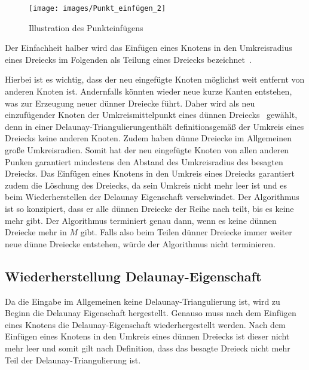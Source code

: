  \begin{figure}[h]
    \centering
    \texttt{[image: images/Punkt\_einfügen\_2]}
    \caption{Illustration des Punkteinfügens\cite{Sharp:2019:NIT} }%
    \label{fig:Punkt_einfügen}
\end{figure}
 
 
Der Einfachheit halber wird das Einfügen eines Knotens in den Umkreisradius eines Dreiecks im Folgenden als Teilung eines Dreiecks  bezeichnet~\cite[zitiert nach \cite{shewchuk:1997:delaunay}]{Frey:1987:Umkreismittelpunkt}.
 

Hierbei ist es wichtig, dass der neu eingefügte Knoten möglichst weit entfernt von anderen Knoten ist. Andernfalls könnten wieder neue kurze Kanten entstehen, was zur Erzeugung neuer dünner Dreiecke führt. 
Daher wird als neu einzufügender Knoten der Umkreismittelpunkt eines dünnen Dreiecks~\cite{ruppert:1995:delaunay, Frey:1987:Umkreismittelpunkt} gewählt, denn in einer Delaunay-Triangulierungenthält definitionsgemäß der Umkreis eines Dreiecks keine anderen Knoten. Zudem haben dünne Dreiecke im Allgemeinen große Umkreisradien. Somit hat der neu eingefügte Knoten von allen anderen Punken garantiert mindestens den Abstand des Umkreisradius des besagten Dreiecks. Das Einfügen eines Knotens in den Umkreis eines Dreiecks garantiert zudem die Löschung des Dreiecks, da sein Umkreis nicht mehr leer ist und es beim Wiederherstellen der Delaunay Eigenschaft verschwindet. 
Der Algorithmus ist so konzipiert, dass er alle dünnen Dreiecke der Reihe nach teilt, bis es keine mehr gibt. Der Algorithmus terminiert genau dann, wenn es keine dünnen Dreiecke mehr in $M$ gibt. Falls also beim Teilen dünner Dreiecke immer weiter neue dünne Dreiecke entstehen, würde der Algorithmus nicht terminieren.


 

\subsection*{Wiederherstellung Delaunay-Eigenschaft}
Da die Eingabe im Allgemeinen keine Delaunay-Triangulierung ist, wird zu Beginn die Delaunay Eigenschaft hergestellt.
Genauso muss nach dem Einfügen eines Knotens die Delaunay-Eigenschaft wiederhergestellt werden. Nach dem Einfügen eines Knotens in den Umkreis eines dünnen Dreiecks ist dieser nicht mehr leer und somit gilt nach Definition, dass das besagte Dreieck nicht mehr Teil der Delaunay-Triangulierung ist. \\

